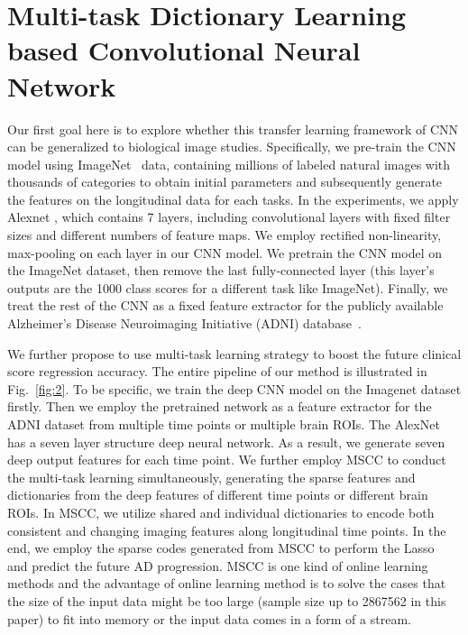 \documentclass[10pt,twocolumn,letterpaper]{article}
\begin{document}
\section{Multi-task Dictionary Learning based Convolutional Neural Network}
Our first goal here is to explore whether this transfer learning framework of CNN can be generalized to biological image studies. Specifically, we pre-train the CNN model using ImageNet~\cite{deng2009imagenet} data, containing millions of labeled natural images with thousands of categories to obtain initial parameters and subsequently generate the features on the longitudinal data for each tasks. In the experiments, we apply Alexnet \cite{krizhevsky2012imagenet}, which contains 7 layers, including convolutional layers with fixed filter sizes and different numbers of feature maps. We employ rectified non-linearity, max-pooling on each layer in our CNN model. We pretrain the CNN model on the ImageNet dataset, then remove the last fully-connected layer (this layer's outputs are the 1000 class scores for a different task like ImageNet). Finally, we treat the rest of the CNN as a fixed feature extractor for the publicly available Alzheimer's Disease Neuroimaging Initiative (ADNI) database~\cite{jack2008alzheimer}.

We further propose to use multi-task learning strategy to boost the future clinical score regression accuracy. The entire pipeline of our method is illustrated in Fig.~\ref{fig:2}. To be specific, we train the deep CNN model on the Imagenet dataset firstly. Then we employ the pretrained network as a feature extractor for the ADNI dataset from multiple time points or multiple brain ROIs. The AlexNet has a seven layer structure deep neural network. As a result, we generate seven deep output features for each time point. We further employ MSCC to conduct the multi-task learning simultaneously, generating the sparse features and dictionaries from the deep features of different time points or different brain ROIs. In MSCC, we utilize shared and individual dictionaries to encode both consistent and changing imaging features along longitudinal time points. In the end, we employ the sparse codes generated from MSCC to perform the Lasso~\cite{tibshirani1996regression} and predict the future AD progression. MSCC is one kind of online learning methods and the advantage of online learning method is to solve the cases that the size of the input data might be too large (sample size up to 2867562 in this paper) to fit into memory or the input data comes in a form of a stream.
\end{document}

